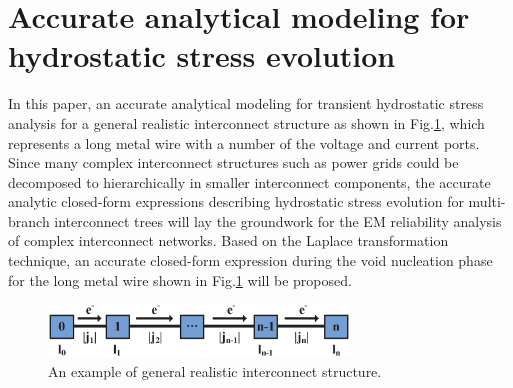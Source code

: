 \section{Accurate analytical modeling for hydrostatic stress evolution}
\label{sec:multi_segment}
In this paper, an accurate analytical modeling for transient hydrostatic stress analysis for a general realistic interconnect structure as shown in Fig.\ref{fig:interconnect_tree}, which represents a long metal wire with a number of the voltage and current ports. Since many complex interconnect structures such as power grids could be decomposed to hierarchically in smaller interconnect components, the accurate analytic closed-form expressions describing hydrostatic stress evolution for multi-branch interconnect trees will lay the groundwork for the EM reliability analysis of complex interconnect networks. Based on the Laplace transformation technique, an accurate closed-form expression during the void nucleation phase for the long metal wire shown in Fig.\ref{fig:interconnect_tree} will be proposed.
\label{sec:analytical_stress}
\begin{figure}[ht] \centering
\includegraphics[width=80mm]{Sn.eps}
\caption{An example of general realistic interconnect structure.}
  \label{fig:interconnect_tree}
  \vspace{-0.12in}
\end{figure}


